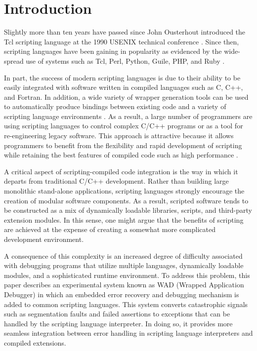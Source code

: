\section{Introduction}

Slightly more than ten years have passed since John Ousterhout
introduced the Tcl scripting language at the 1990 USENIX technical
conference \cite{ousterhout}.  Since then, scripting languages have
been gaining in popularity as evidenced by the wide-spread use of
systems such as Tcl, Perl, Python, Guile, PHP, and Ruby
\cite{ousterhout,perl,python,guile,php,ruby}. 

In part, the success of modern scripting languages is due to their
ability to be easily integrated with software written in compiled
languages such as C, C++, and Fortran.  In addition, a wide variety of wrapper
generation tools can be used
to automatically produce bindings between existing code and a
variety of scripting language environments
\cite{swig,sip,pyfort,f2py,advperl,heidrich,vtk,gwrap,wrappy}.  As a result, a large number of
programmers are using scripting languages to control
complex C/C++ programs or as a tool for re-engineering legacy
software.  This approach is attractive because it allows programmers
to benefit from the flexibility and rapid development of
scripting while retaining the best features of compiled code such as high
performance \cite{ouster1}.

A critical aspect of scripting-compiled code integration is the way in
which it departs from traditional C/C++ development.  Rather than
building large monolithic stand-alone applications, scripting
languages strongly encourage the creation of modular software
components.  As a result, scripted software tends to be constructed as
a mix of dynamically loadable libraries, scripts, and third-party
extension modules. In this sense, one might argue that the benefits of
scripting are achieved at the expense of creating a somewhat more
complicated development environment.

A consequence of this complexity is an increased degree of difficulty
associated with debugging programs that utilize multiple languages,
dynamically loadable modules, and a sophisticated runtime environment.
To address this problem, this paper describes an experimental system
known as WAD (Wrapped Application Debugger) in which an embedded error
recovery and debugging mechanism is added to common scripting
languages.  This system converts catastrophic signals such as
segmentation faults and failed assertions to exceptions that can be
handled by the scripting language interpreter.  In doing so, it
provides more seamless integration between error handling in
scripting language interpreters and compiled extensions. 

